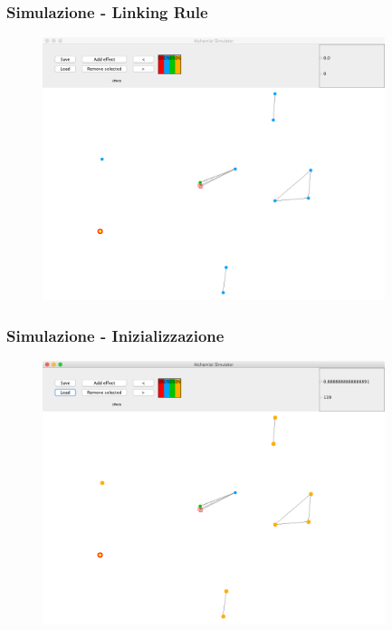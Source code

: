 \documentclass[handout]{beamer}\mode<presentation>{\usetheme{AMSCesenaBleu}}
\begin{document}
\begin{frame}
\frametitle{Simulazione - Linking Rule}
\vspace*{-0.25cm}
\begin{figure}
\includegraphics[width=10cm]{images/simul_link.png}
\end{figure}
\end{frame}

\begin{frame}
\frametitle{Simulazione - Inizializzazione}
\vspace*{-0.25cm}
\begin{figure}
\includegraphics[width=10cm]{images/simul_init.png}
\end{figure}
\end{frame}
\end{document}
